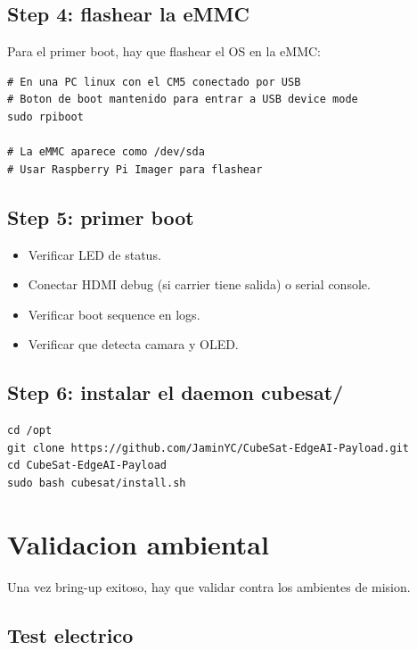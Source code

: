 \documentclass[11pt,a4paper,oneside,openright]{book}
\begin{document}
\section{Step 4: flashear la eMMC}

Para el primer boot, hay que flashear el OS en la eMMC:

\begin{lstlisting}
# En una PC linux con el CM5 conectado por USB
# Boton de boot mantenido para entrar a USB device mode
sudo rpiboot

# La eMMC aparece como /dev/sda
# Usar Raspberry Pi Imager para flashear
\end{lstlisting}

\section{Step 5: primer boot}

\begin{itemize}[leftmargin=2em]
  \item Verificar LED de status.
  \item Conectar HDMI debug (si carrier tiene salida) o serial console.
  \item Verificar boot sequence en logs.
  \item Verificar que detecta camara y OLED.
\end{itemize}

\section{Step 6: instalar el daemon cubesat/}

\begin{lstlisting}
cd /opt
git clone https://github.com/JaminYC/CubeSat-EdgeAI-Payload.git
cd CubeSat-EdgeAI-Payload
sudo bash cubesat/install.sh
\end{lstlisting}

\chapter{Validacion ambiental}

Una vez bring-up exitoso, hay que validar contra los ambientes de
mision.

\section{Test electrico}
\end{document}

